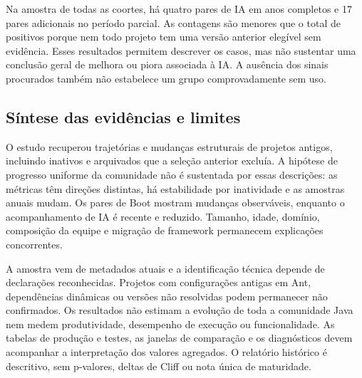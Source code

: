 Na amostra de todas as coortes, há quatro pares de IA em anos completos e 17 pares adicionais no período parcial. As contagens são menores que o total de positivos porque nem todo projeto tem uma versão anterior elegível sem evidência. Esses resultados permitem descrever os casos, mas não sustentar uma conclusão geral de melhora ou piora associada à IA. A ausência dos sinais procurados também não estabelece um grupo comprovadamente sem uso.

\subsection{Síntese das evidências e limites}

O estudo recuperou trajetórias e mudanças estruturais de projetos antigos, incluindo inativos e arquivados que a seleção anterior excluía. A hipótese de progresso uniforme da comunidade não é sustentada por essas descrições: as métricas têm direções distintas, há estabilidade por inatividade e as amostras anuais mudam. Os pares de Boot mostram mudanças observáveis, enquanto o acompanhamento de IA é recente e reduzido. Tamanho, idade, domínio, composição da equipe e migração de framework permanecem explicações concorrentes.

A amostra vem de metadados atuais e a identificação técnica depende de declarações reconhecidas. Projetos com configurações antigas em Ant, dependências dinâmicas ou versões não resolvidas podem permanecer não confirmados. Os resultados não estimam a evolução de toda a comunidade Java nem medem produtividade, desempenho de execução ou funcionalidade. As tabelas de produção e testes, as janelas de comparação e os diagnósticos devem acompanhar a interpretação dos valores agregados. O relatório histórico é descritivo, sem p-valores, deltas de Cliff ou nota única de maturidade.
